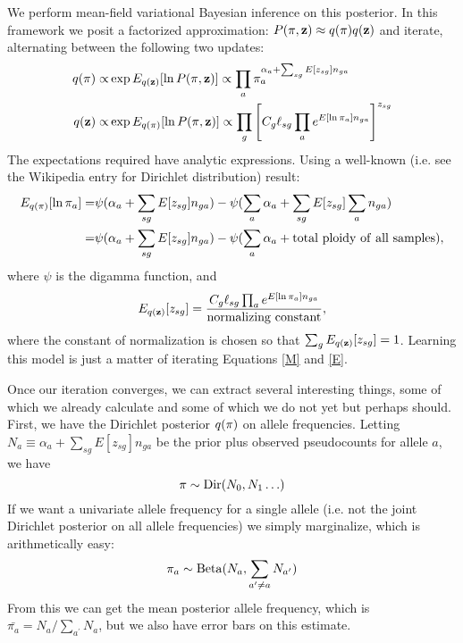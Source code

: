 \documentclass[nofootinbib,amssymb,amsmath]{revtex4}
\newcommand{\vz}{{\bf z}}
\newcommand{\vpi}{{\bf \pi}}
\begin{document}
We perform mean-field variational Bayesian inference on this posterior.  In this framework we posit a factorized approximation: $P(\vpi, \vz) \approx q(\vpi) q(\vz)$ and iterate, alternating between the following two updates:
\begin{align}
q(\vpi) \propto& \exp E_{q(\vz)}[\ln P(\vpi, \vz)] \propto \prod_a \pi_a^{\alpha_a + \sum_{sg} E[z_{sg}] n_{ga}} \label{M}\\
q(\vz) \propto& \exp E_{q(\vpi)}[\ln P(\vpi, \vz)] \propto \prod_g \left[ C_g \ell_{sg} \prod_a e^{ E[\ln \pi_a] n_{ga}} \right]^{z_{sg}} \label{E}
\end{align}
The expectations required have analytic expressions.  Using a well-known (i.e. see the Wikipedia entry for Dirichlet distribution) result:
\begin{align}
E_{q(\vpi)} [ \ln \pi_a ] =& \psi( \alpha_a + \sum_{sg} E[z_{sg}] n_{ga}) - \psi (\sum_a \alpha_a + \sum_{sg} E[z_{sg}]  \sum_a n_{ga}) \\
=& \psi( \alpha_a + \sum_{sg} E[z_{sg}] n_{ga}) - \psi (\sum_a \alpha_a + {\rm total~ploidy~of~all~samples}),
\label{pi_update}
\end{align}
where $\psi$ is the digamma function, and
\begin{align}
E_{q(\vz)}[z_{sg}] = \frac{C_g \ell_{sg} \prod_a e^{ E[\ln \pi_a] n_{ga}}}{\rm normalizing~constant},
\label{z_update}
\end{align}
where the constant of normalization is chosen so that $\sum_g E_{q(\vz)}[z_{sg}] = 1$.  Learning this model is just a matter of iterating Equations \ref{M} and \ref{E}.

Once our iteration converges, we can extract several interesting things, some of which we already calculate and some of which we do not yet but perhaps should.  First, we have the Dirichlet posterior $q(\vpi)$ on allele frequencies.  Letting $N_a \equiv \alpha_a + \sum_{sg} E[z_{sg}] n_{ga}$ be the prior plus observed pseudocounts for allele $a$, we have
\begin{equation}
\vpi \sim {\rm Dir}(N_0, N_1 \ldots)
\end{equation}
If we want a univariate allele frequency for a single allele (i.e. not the joint Dirichlet posterior on all allele frequencies) we simply marginalize, which is arithmetically easy:
\begin{equation}
\pi_a \sim {\rm Beta}(N_a, \sum_{a^\prime \ne a} N_{a^\prime})
\end{equation}
From this we can get the mean posterior allele frequency, which is $\bar{\pi_a} = N_a / \sum_{a^\prime} N_a$, but we also have error bars on this estimate.
\end{document}
